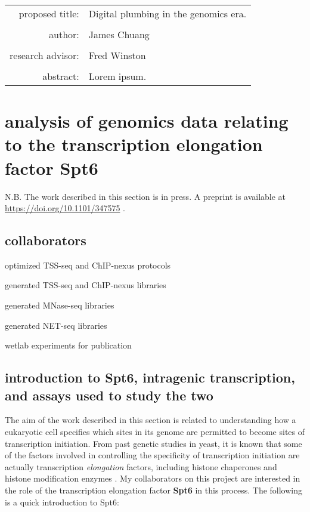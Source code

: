 \documentclass[10pt, letterpaper]{article}
\begin{document}
\begin{titlepage}
\begin{tabular}{ r l }
 proposed title:   & Digital plumbing in the genomics era. \\
 		   & \\
 author:	   & James Chuang \\
 		   & \\
 research advisor: & Fred Winston \\
 		   & \\
 abstract:	   & Lorem ipsum.
\end{tabular}
\end{titlepage}

\tableofcontents
\newpage

\section{analysis of genomics data relating to the transcription elongation factor Spt6}

N.B. The work described in this section is in press. A preprint is available at \url{https://doi.org/10.1101/347575} \cite{doris2018}.

\subsection{collaborators}

\begin{description}[align=right, labelwidth=5cm, noitemsep]
    \item [Steve Doris] optimized TSS-seq and ChIP-nexus protocols
    \item [] generated TSS-seq and ChIP-nexus libraries
    \item [Olga Viktorovskaya] generated MNase-seq libraries
    \item [Magdalenda Murawska] generated NET-seq libraries
    \item [Dan Spatt] wetlab experiments for publication
\end{description}

\subsection{introduction to Spt6, intragenic transcription, and assays used to study the two}

The aim of the work described in this section is related to understanding how a eukaryotic cell specifies which sites in its genome are permitted to become sites of transcription initiation. From past genetic studies in yeast, it is known that some of the factors involved in controlling the specificity of transcription initiation are actually transcription \textit{elongation} factors, including histone chaperones and histone modification enzymes \cite{kaplan2003, cheung2008, hennig2013}. My collaborators on this project are interested in the role of the transcription elongation factor \textbf{Spt6} in this process. The following is a quick introduction to Spt6:
\end{document}
